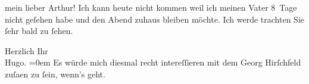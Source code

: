 \pstart{}mein lieber Arthur!\pend\vspace{0.5em}
\pstart
           Ich kann heute nicht kommen weil ich meinen Vater 8 Tage nicht geſehen habe und den Abend zuhaus
               bleiben möchte. Ich werde trachten Sie{ }ſehr bald zu{ }ſehen.\pend
           
\pstart
           Herzlich Ihr{\\[\baselineskip]}\spacefill\mbox{Hugo.}\pend
           \leftskip=0em{}
\pstart
           \noindent{}Es würde mich diesmal recht intereſſieren mit dem Georg Hirſchfeld zuſa{\geminationm}en zu{ }ſein, wenn’s geht.\pend
           \endnumbering{}  \newcommand{\dateiname}{L00601}\newcommand{\titel}{Hugo von Hofmannsthal an Arthur Schnitzler, 6. 10. 1896}\newcommand{\editorInnen}{Martin Anton Müller und Gerd-Hermann Susen}
